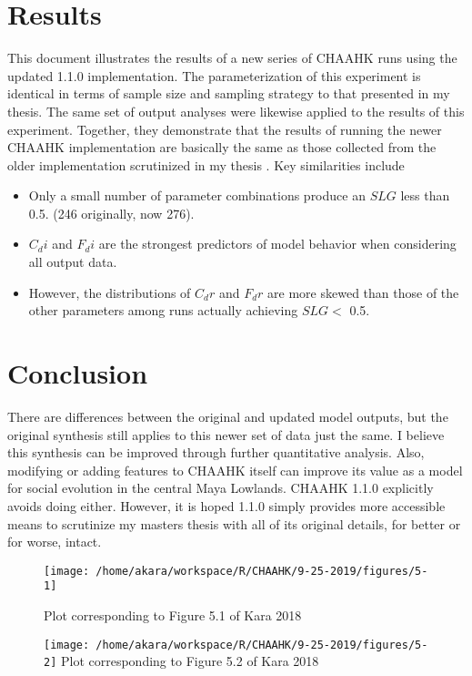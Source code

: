 \documentclass{article}
\begin{document}
\section{Results}
This document illustrates the results of a new series of CHAAHK runs using the updated 1.1.0 implementation. The parameterization of this experiment is identical in terms of sample size and sampling strategy to that presented in my thesis. The same set of output analyses were likewise applied to the results of this experiment. Together, they demonstrate that the results of running the newer CHAAHK implementation are basically the same as those collected from the older implementation scrutinized in my thesis \cite{kara2018b}. Key similarities include 

\begin{itemize}
	\item Only a small number of parameter combinations produce an $ SLG $ less than 0.5. (246 originally, now 276).
	\item $ C_{d}i $ and $ F_{d}i $ are the strongest predictors of model behavior when considering all output data.
	\item However, the distributions of $ C_{d}r $ and $ F_{d}r $ are more skewed than those of the other parameters among runs actually achieving $ SLG  <$  0.5.
\end{itemize}

\section{Conclusion}
There are differences between the original and updated model outputs, but the original synthesis still applies to this newer set of data just the same. I believe this synthesis can be improved through further quantitative analysis. Also, modifying or adding features to CHAAHK itself can improve its value as a model for social evolution in the central Maya Lowlands. CHAAHK 1.1.0 explicitly avoids doing either. However, it is hoped 1.1.0 simply provides more accessible means to scrutinize my masters thesis with all of its original details, for better or for worse, intact.

\begin{figure}[H]
	\texttt{[image: /home/akara/workspace/R/CHAAHK/9-25-2019/figures/5-1]}
	
	Plot corresponding to Figure 5.1 of Kara 2018
	\label{fig:5-1}
\end{figure}

\begin{figure}[H]
	\texttt{[image: /home/akara/workspace/R/CHAAHK/9-25-2019/figures/5-2]}
	Plot corresponding to Figure 5.2 of Kara 2018
	\label{fig:5-2}
\end{figure}
\end{document}
